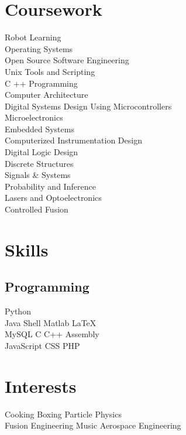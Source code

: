 \documentclass[]{deedy-resume-openfont}
\begin{document}
\begin{minipage}[t]{0.33\textwidth}
    \section{Coursework}
        Robot Learning\\
        Operating Systems \\
        Open Source Software Engineering \\
        Unix Tools and Scripting \\
        C ++ Programming\\
        Computer Architecture\\
        Digital Systems Design Using Microcontrollers\\
        Microelectronics\\
        Embedded Systems\\
        Computerized Instrumentation Design\\
        Digital Logic Design\\
        Discrete Structures\\
        Signals \& Systems\\
        Probability and Inference\\
        Lasers and Optoelectronics\\
        Controlled Fusion\\
    \sectionsep

    \section{Skills}
        \subsection{Programming}
            Python \\
            Java \textbullet{}
            Shell \textbullet{}
            Matlab \textbullet{}
            \LaTeX\ \\
            MySQL \textbullet{}
            C \textbullet{}
            C++ \textbullet{}
            Assembly \\
            JavaScript \textbullet{}
            CSS \textbullet{}
            PHP \\
    \sectionsep

    \section{Interests}
        Cooking \textbullet{}
        Boxing \textbullet{}
        Particle Physics \\
        Fusion Engineering \textbullet{}
        Music \textbullet{}
        Aerospace Engineering
    \sectionsep

\end{minipage}
\end{document}
